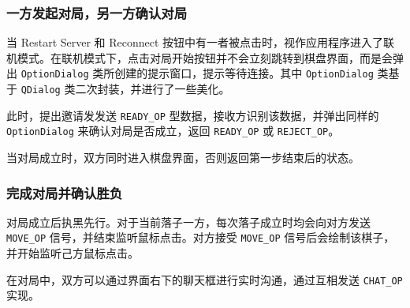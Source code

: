 \documentclass{noithesis}
\begin{document}
	\subsubsection{一方发起对局，另一方确认对局}
	
	当 Restart Server 和 Reconnect 按钮中有一者被点击时，视作应用程序进入了联机模式。在联机模式下，点击对局开始按钮并不会立刻跳转到棋盘界面，而是会弹出 \verb|OptionDialog| 类所创建的提示窗口，提示等待连接。其中 \verb|OptionDialog| 类基于 \verb|QDialog| 类二次封装，并进行了一些美化。
	
	此时，提出邀请发发送 \verb|READY_OP| 型数据，接收方识别该数据，并弹出同样的 \verb|OptionDialog| 来确认对局是否成立，返回 \verb|READY_OP| 或 \verb|REJECT_OP|。
	
	当对局成立时，双方同时进入棋盘界面，否则返回第一步结束后的状态。 

    \subsubsection{完成对局并确认胜负}
    
    对局成立后执黑先行。对于当前落子一方，每次落子成立时均会向对方发送 \verb|MOVE_OP| 信号，并结束监听鼠标点击。对方接受 \verb|MOVE_OP| 信号后会绘制该棋子，并开始监听己方鼠标点击。
    
    在对局中，双方可以通过界面右下的聊天框进行实时沟通，通过互相发送 \verb|CHAT_OP| 实现。
    
\end{document}
